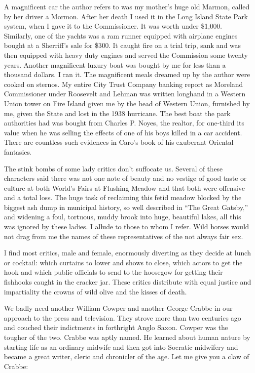 \documentclass[11pt,letterpaper]{article}
\begin{document}
A magnificent car the author refers to was my mother's huge old Marmon, called by her driver a Mormon. After her death I used it in the Long Island State Park system, when I gave it to the Commissioner. It was worth under \$1,000. Similarly, one of the yachts was a ram runner equipped with airplane engines bought at a Sherriff's sale for \$300. It caught fire on a trial trip, sank and was then equipped with heavy duty engines and served the Commission some twenty years. Another magnificent luxury boat was bought by me for less than a thousand dollars. I ran it. The magnificent meals dreamed up by the author were cooked on sternos. My entire City Trust Company banking report as Moreland Commissioner under Roosevelt and Lehman was written longhand in a Western Union tower on Fire Island given me by the head of Western Union, furnished by me, given the State and lost in the 1938 hurricane. The best boat the park authorities had was bought from Charles P. Noyes, the realtor, for one-third its value when he was selling the effects of one of his boys killed in a car accident. There are countless such evidences in Caro's book of his exuberant Oriental fantasies.

The stink bombs of some lady critics don't suffocate us. Several of these characters said there was not one note of beauty and no vestige of good taste or culture at both World's Fairs at Flushing Meadow and that both were offensive and a total loss. The huge task of reclaiming this fetid meadow blocked by the biggest ash dump in municipal history, so well described in \enquote{The Great Gatsby,} and widening a foul, tortuous, muddy brook into huge, beautiful lakes, all this was ignored by these ladies. I allude to those to whom I refer. Wild horses would not drag from me the names of these representatives of the not always fair sex.

I find most critics, male and female, enormously diverting as they decide at lunch or cocktail: which curtains to lower and shows to close, which actors to get the hook and which public officials to send to the hoosegow for getting their fishhooks caught in the cracker jar. These critics distribute with equal justice and impartiality the crowns of wild olive and the kisses of death.

We badly need another William Cowper and another George Crabbe in our approach to the press and television. They strove more than two centuries ago and couched their indictments in forthright Anglo Saxon. Cowper was the tougher of the two. Crabbe was aptly named. He learned about human nature by starting life as an ordinary midwife and then got into Socratic midwifery and became a great writer, cleric and chronicler of the age. Let me give you a claw of Crabbe:
\end{document}
